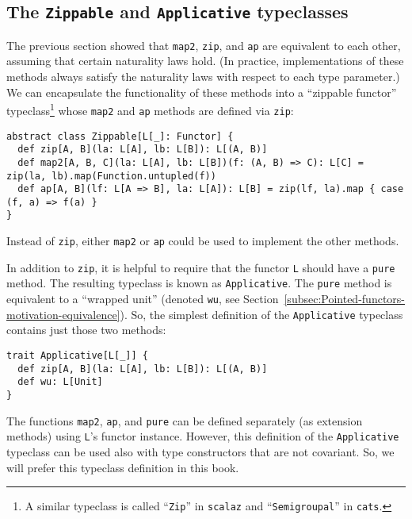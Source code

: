 \subsection{The \texttt{Zippable} and \texttt{Applicative} typeclasses\label{subsec:The-Zippable-and-Applicative-typeclass}}

The previous section showed that \lstinline!map2!, \lstinline!zip!,
and \lstinline!ap! are equivalent to each other, assuming that certain
naturality laws hold. (In practice, implementations of these methods
always satisfy the naturality laws with respect to each type parameter.)
We can encapsulate the functionality of these methods into a \textsf{``}zippable
functor\textsf{''} typeclass\footnote{A similar typeclass is called \textsf{``}\lstinline!Zip!\textsf{''} in \texttt{scalaz}
and \textsf{``}\lstinline!Semigroupal!\textsf{''} in \texttt{cats}.} whose \lstinline!map2! and \lstinline!ap! methods are defined via
\lstinline!zip!:
\begin{lstlisting}
abstract class Zippable[L[_]: Functor] {
  def zip[A, B](la: L[A], lb: L[B]): L[(A, B)]
  def map2[A, B, C](la: L[A], lb: L[B])(f: (A, B) => C): L[C] = zip(la, lb).map(Function.untupled(f))
  def ap[A, B](lf: L[A => B], la: L[A]): L[B] = zip(lf, la).map { case (f, a) => f(a) }
}
\end{lstlisting}
Instead of \lstinline!zip!, either \lstinline!map2! or \lstinline!ap!
could be used to implement the other methods.

In addition to \lstinline!zip!, it is helpful to require that the
functor \lstinline!L! should have a \lstinline!pure! method. The
resulting typeclass
is known as \lstinline!Applicative!. The \lstinline!pure! method
is equivalent to a \textsf{``}wrapped unit\textsf{''} (denoted \lstinline!wu!, see
Section~\ref{subsec:Pointed-functors-motivation-equivalence}). So,
the simplest definition of the \lstinline!Applicative! typeclass
contains just those two methods:
\begin{lstlisting}
trait Applicative[L[_]] {
  def zip[A, B](la: L[A], lb: L[B]): L[(A, B)]
  def wu: L[Unit]
}
\end{lstlisting}
The functions \lstinline!map2!, \lstinline!ap!, and \lstinline!pure!
can be defined separately (as extension methods) using \lstinline!L!\textsf{'}s
functor instance. However, this definition of the \lstinline!Applicative!
typeclass can be used also with type constructors that are not covariant.
So, we will prefer this typeclass definition in this book.

